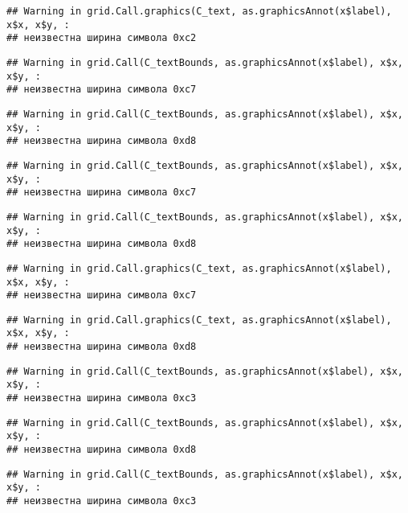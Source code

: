 \documentclass[
]{article}
\begin{document}
\begin{verbatim}
## Warning in grid.Call.graphics(C_text, as.graphicsAnnot(x$label), x$x, x$y, :
## неизвестна ширина символа 0xc2
\end{verbatim}

\begin{verbatim}
## Warning in grid.Call(C_textBounds, as.graphicsAnnot(x$label), x$x, x$y, :
## неизвестна ширина символа 0xc7
\end{verbatim}

\begin{verbatim}
## Warning in grid.Call(C_textBounds, as.graphicsAnnot(x$label), x$x, x$y, :
## неизвестна ширина символа 0xd8
\end{verbatim}

\begin{verbatim}
## Warning in grid.Call(C_textBounds, as.graphicsAnnot(x$label), x$x, x$y, :
## неизвестна ширина символа 0xc7
\end{verbatim}

\begin{verbatim}
## Warning in grid.Call(C_textBounds, as.graphicsAnnot(x$label), x$x, x$y, :
## неизвестна ширина символа 0xd8
\end{verbatim}

\begin{verbatim}
## Warning in grid.Call.graphics(C_text, as.graphicsAnnot(x$label), x$x, x$y, :
## неизвестна ширина символа 0xc7
\end{verbatim}

\begin{verbatim}
## Warning in grid.Call.graphics(C_text, as.graphicsAnnot(x$label), x$x, x$y, :
## неизвестна ширина символа 0xd8
\end{verbatim}

\begin{verbatim}
## Warning in grid.Call(C_textBounds, as.graphicsAnnot(x$label), x$x, x$y, :
## неизвестна ширина символа 0xc3
\end{verbatim}

\begin{verbatim}
## Warning in grid.Call(C_textBounds, as.graphicsAnnot(x$label), x$x, x$y, :
## неизвестна ширина символа 0xd8
\end{verbatim}

\begin{verbatim}
## Warning in grid.Call(C_textBounds, as.graphicsAnnot(x$label), x$x, x$y, :
## неизвестна ширина символа 0xc3
\end{verbatim}
\end{document}
